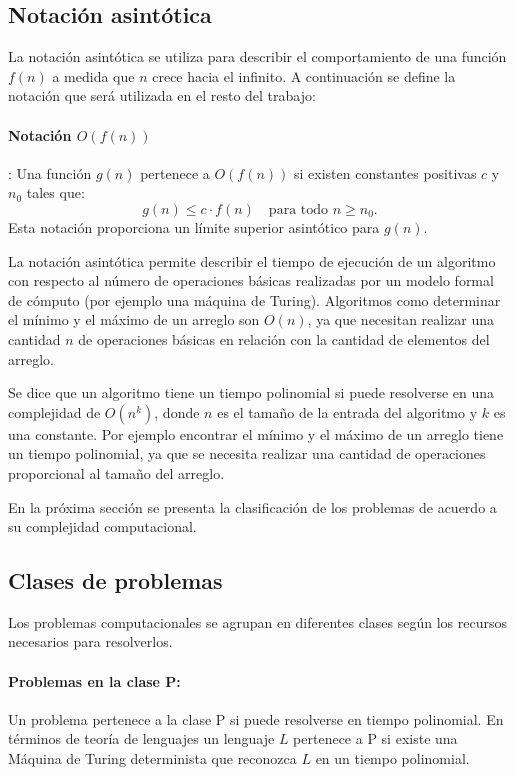 \subsection{Notación asintótica}

La notación asintótica se utiliza para describir el comportamiento de una función $f(n)$ a medida que $n$ crece hacia el infinito. 
A continuación se define la notación que será utilizada en el resto del trabajo:

\paragraph{Notación $O(f(n))$}: Una función $g(n)$ pertenece a $O(f(n))$ si existen constantes positivas $c$ y $n_0$ tales que:
\[
  g(n) \leq c \cdot f(n) \quad \text{para todo } n \geq n_0.
\]
Esta notación proporciona un límite superior asintótico para $g(n)$.

La notación asintótica permite describir el tiempo de ejecución de un algoritmo con respecto al número de 
operaciones básicas realizadas por un modelo formal de cómputo (por ejemplo una máquina de Turing). 
Algoritmos como determinar el mínimo y el máximo de un arreglo son $O(n)$, ya que necesitan realizar 
una cantidad $n$ de operaciones básicas en relación con la cantidad de elementos del arreglo.

Se dice que un algoritmo tiene un tiempo polinomial si puede resolverse en una complejidad de $O(n^k)$, donde $n$ es el tamaño de la entrada del algoritmo y $k$
es una constante. Por ejemplo encontrar el mínimo y el máximo de un arreglo tiene un tiempo polinomial, ya que se necesita realizar una cantidad de operaciones
proporcional al tamaño del arreglo.

En la próxima sección se presenta la clasificación de los problemas de acuerdo a su complejidad computacional.
\subsection{Clases de problemas}

Los problemas computacionales \cite{authomataTheory} se agrupan en diferentes clases según los recursos necesarios para resolverlos.

\paragraph{Problemas en la clase P:}
Un problema pertenece a la clase P si puede resolverse en tiempo polinomial. En términos de teoría de lenguajes un lenguaje
$L$ pertenece a P si existe una Máquina de Turing determinista que reconozca $L$ en un tiempo polinomial.

